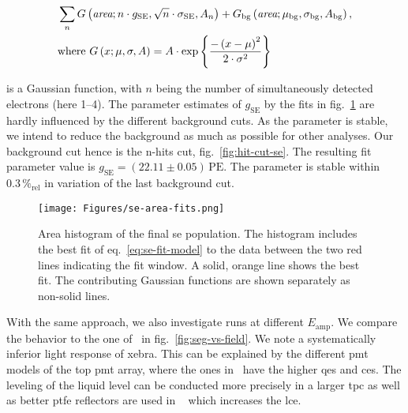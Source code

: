 \begin{align}
    &\sum_{n} G \left(  \textit{area}; n \cdot g_\mathrm{SE}, \sqrt{n} \cdot \sigma_\mathrm{SE}, A_n \right) +
    G_\mathrm{bg} \left( \textit{area};  \mu_\mathrm{bg}, \sigma_\mathrm{bg}, A_\mathrm{bg} \right), \\
    &\mathrm{where~} G \left( x;  \mu, \sigma, A \right) = A \cdot \exp{ \left\{ \frac{-\left( x - \mu \right)^2}{2\cdot\sigma^2} \right\} }
    \label{eq:se-fit-model}
\end{align}


is a Gaussian function, with $ n $ being the number of simultaneously detected electrons (here \numrange{1}{4}).
The parameter estimates of $ g_\mathrm{SE} $ by the fits in fig.~\ref{fig:se-area-fits} are hardly influenced by the different background cuts.
As the parameter is stable, we intend to reduce the background as much as possible for other analyses.
Our background cut hence is the n-hits cut, fig.~\ref{fig:hit-cut-se}.
The resulting fit parameter value is $ g_\mathrm{SE} = (22.11 \pm 0.05)\,\mathrm{PE} $.
The parameter is stable within $ 0.3\,\%_\mathrm{rel} $ in variation of the last background cut.


\begin{figure}
    \centering
    \texttt{[image: Figures/se-area-fits.png]}  %
    \caption[Area Histogram Fit of SEs]{
        Area histogram of the final \gls{se} population.
        The histogram includes the best fit of eq.~\ref{eq:se-fit-model} to the data between the two red lines indicating the fit window.
        A solid, orange line shows the best fit.
        The contributing Gaussian functions are shown separately as non-solid lines.
    }
    \label{fig:se-area-fits}
\end{figure}

With the same approach, we also investigate runs at different $ E_\mathrm{amp} $.
We compare the behavior to the one of \oneton~in fig.~\ref{fig:seg-vs-field}.
We note a systematically inferior light response of \gls{xebra}.  %
This can be explained by the different \gls{pmt} models of the top \gls{pmt} array, where the ones in \oneton~have the higher \glspl{qe} and \glspl{ce}.
The leveling of the liquid level can be conducted more precisely in a larger \gls{tpc} as well as better \gls{ptfe} reflectors are used in \oneton~ which increases the \gls{lce}.


